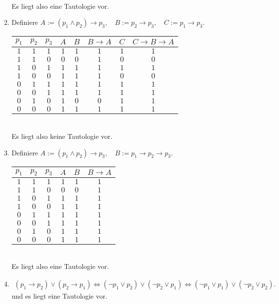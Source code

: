 \begin{solution}
\begin{enumerate}[label = \alph*.]
\begin{tabular}{|c|c|c|c|c|c|c|c|}
    \hline
    \end{tabular} \\
    Es liegt also eine Tautologie vor.
    \item
    Definiere $A := (p_1 \land p_2) \to p_3, \quad B := p_2 \to p_3, \quad C:= p_1 \to p_3$. \\
    \begin{tabular}{|c|c|c|c|c|c|c|c|}
    \hline
    $p_1$ & $p_2$ & $p_3$ & $A$ & $B$ & $B \to A$
    & $C$ & $C \to B \to A$\\
    \hline
    $1$ & $1$ & $1$ & $1$ & $1$ & $1$ & $1$ & $1$\\
    \hline
    $1$ & $1$ & $0$ & $0$ & $0$ & $1$ & $0$ & $0$\\
    \hline
    $1$ & $0$ & $1$ & $1$ & $1$ & $1$ & $1$ & $1$\\
    \hline
    $1$ & $0$ & $0$ & $1$ & $1$ & $1$ & $0$ & $0$\\
    \hline
    $0$ & $1$ & $1$ & $1$ & $1$ & $1$ & $1$ & $1$\\
    \hline
    $0$ & $0$ & $1$ & $1$ & $1$ & $1$ & $1$ & $1$\\
    \hline
    $0$ & $1$ & $0$ & $1$ & $0$ & $0$ & $1$ & $1$\\
    \hline
    $0$ & $0$ & $0$ & $1$ & $1$ & $1$ & $1$ & $1$\\
    \hline
    \end{tabular} \\
    Es liegt also keine Tautologie vor.
    \item
    Definiere $A:= (p_1 \land p_2) \to p_3, \quad B := p_1 \to p_2 \to p_3$. \\
    \begin{tabular}{|c|c|c|c|c|c|}
    \hline
    $p_1$ & $p_2$ & $p_3$ & $A$ & $B$ & $B \to A$\\
    \hline
    $1$ & $1$ & $1$ & $1$ & $1$ & $1$\\
    \hline
    $1$ & $1$ & $0$ & $0$ & $0$ & $1$\\
    \hline
    $1$ & $0$ & $1$ & $1$ & $1$ & $1$\\
    \hline
    $1$ & $0$ & $0$ & $1$ & $1$ & $1$\\
    \hline
    $0$ & $1$ & $1$ & $1$ & $1$ & $1$\\
    \hline
    $0$ & $0$ & $1$ & $1$ & $1$ & $1$\\
    \hline
    $0$ & $1$ & $0$ & $1$ & $1$ & $1$\\
    \hline
    $0$ & $0$ & $0$ & $1$ & $1$ & $1$\\
    \hline
    \end{tabular} \\
    Es liegt also eine Tautologie vor.
    \item
    \begin{align*}
      (p_1 \to p_2) \lor (p_2 \to p_1) \iff (\neg p_1 \lor p_2) \lor (\neg p_2 \lor p_1) \iff (\neg p_1 \lor p_1) \lor (\neg p_2 \lor p_2).
    \end{align*}
    und es liegt eine Tautologie vor.
\end{enumerate}

\end{solution}

